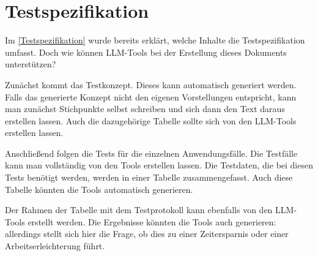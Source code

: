 \section{Testspezifikation}  \label{LLMTestspezifikation}

Im \autoref{Testspezifikation} wurde bereits erklärt, welche Inhalte die Testspezifikation umfasst. Doch wie können 
LLM-Tools bei der Erstellung dieses Dokuments unterstützen?

Zunächst kommt das Testkonzept. Dieses kann automatisch generiert werden. Falls das generierte Konzept nicht den 
eigenen Vorstellungen entspricht, kann man zunächst Stichpunkte selbst schreiben und sich dann den Text daraus 
erstellen lassen. Auch die dazugehörige Tabelle sollte sich von den LLM-Tools erstellen lassen.

Anschließend folgen die Tests für die einzelnen Anwendungsfälle. Die Testfälle kann man vollständig von den Tools 
erstellen lassen. Die Testdaten, die bei diesen Tests benötigt werden, werden in einer Tabelle zusammengefasst. 
Auch diese Tabelle könnten die Tools automatisch generieren.

Der Rahmen der Tabelle mit dem Testprotokoll kann ebenfalls von den LLM-Tools erstellt werden. Die Ergebnisse 
könnten die Tools auch generieren: allerdings stellt sich hier die Frage, ob dies zu einer Zeitersparnis oder 
einer Arbeitserleichterung führt.